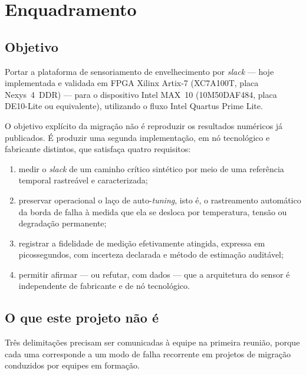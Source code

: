 \documentclass[11pt,a4paper]{article}
\begin{document}
\setcounter{page}{1}
\tableofcontents
\clearpage
{}
\setcounter{page}{1}

\section{Enquadramento}

\subsection{Objetivo}
\label{sec:objetivo}

Portar a plataforma de sensoriamento de envelhecimento por \emph{slack} --- hoje
implementada e validada em FPGA Xilinx Artix-7 (XC7A100T, placa Nexys~4~DDR) ---
para o dispositivo Intel MAX~10 (10M50DAF484, placa DE10-Lite ou equivalente),
utilizando o fluxo Intel Quartus Prime Lite.

O objetivo explícito da migração não é reproduzir os resultados numéricos já
publicados. É produzir uma segunda implementação, em nó tecnológico e fabricante
distintos, que satisfaça quatro requisitos:

\begin{enumerate}
  \item medir o \emph{slack} de um caminho crítico sintético por meio de uma
        referência temporal rastreável e caracterizada;
  \item preservar operacional o laço de auto-\emph{tuning}, isto é, o rastreamento
        automático da borda de falha à medida que ela se desloca por temperatura,
        tensão ou degradação permanente;
  \item registrar a fidelidade de medição efetivamente atingida, expressa em
        picossegundos, com incerteza declarada e método de estimação auditável;
  \item permitir afirmar --- ou refutar, com dados --- que a arquitetura do sensor
        é independente de fabricante e de nó tecnológico.
\end{enumerate}

\subsection{O que este projeto não é}

Três delimitações precisam ser comunicadas à equipe na primeira reunião, porque
cada uma corresponde a um modo de falha recorrente em projetos de migração conduzidos
por equipes em formação.
\end{document}
